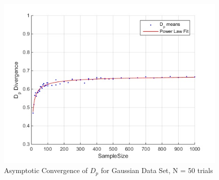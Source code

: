 \documentclass{article}
\begin{document}
		\begin{figure}[h!]
			\caption{Asymptotic Convergence of $D_p$ for Gaussian Data Set, N = 50 trials}
			\centering
			\includegraphics[scale=0.6]{dp_n50_gaussian}
		\end{figure}	
		\newpage
\end{document}
